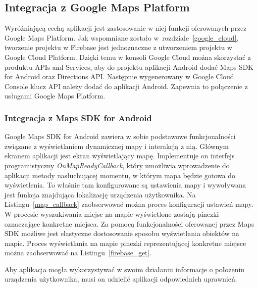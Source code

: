 \subsection{Integracja z Google Maps Platform}

Wyróżniającą cechą aplikacji jest zastosowanie w niej funkcji oferowanych przez Google Maps Platform. Jak wspomniane zostało w~rozdziale~\ref{google_cloud}, tworzenie projektu w Firebase
jest jednoznaczne z utworzeniem projektu w Google Cloud Platform. Dzięki temu w konsoli Google Cloud można skorzystać z produktu APIs and Services, aby do projektu aplikacji Android dodać
Maps SDK for Android oraz Directions API. Następnie wygenerowany w Google Cloud Console klucz API należy dodać do aplikacji Android. Zapewnia to połączenie z usługami Google Maps Platform.

    \subsubsection{Integracja z Maps SDK for Android}
    Google Maps SDK for Android zawiera w sobie podstawowe funkcjonalności związane z wyświetlaniem dynamicznej mapy i interakcją z nią. Głównym ekranem aplikacji jest ekran wyświetlający mapę.
    Implementuje on interfejs programistyczny \emph{OnMapReadyCallback}, który umożliwia wprowadzenie do aplikacji metody nasłuchującej momentu, w którym mapa będzie gotowa do wyświetlenia.
    To właśnie tam konfigurowane są ustawienia mapy i wywoływana jest funkcja znajdująca lokalizację urządzenia użytkownika. Na Listingu~\ref{map_callback} zaobserwować można proces konfiguracji
    ustawień mapy. W procesie wyszukiwania miejsc na mapie wyświetlone zostają pinezki oznaczające konkretne miejsca. Za pomocą funkcjonalności oferowanej przez Maps SDK możliwe jest 
    elastyczne dostosowanie sposobu wyświetlania obiektów na mapie. Proces wyświetlania na mapie pinezki reprezentującej konkretne miejsce można zaobserwować na Listingu~\ref{firebase_get}. 

    Aby aplikacja mogła wykorzystywać w swoim działaniu informacje o położeniu urządzenia użytkownika, musi on udzielić aplikacji odpowiednich uprawnień.

